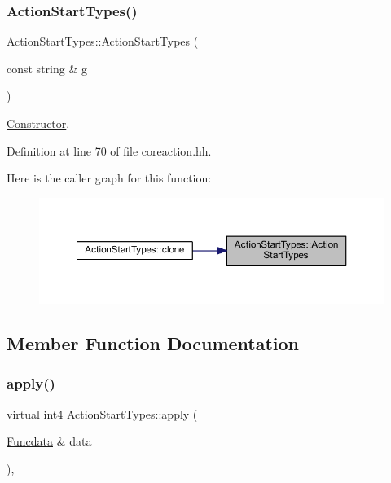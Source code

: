 \subsubsection{\texorpdfstring{ActionStartTypes()}{ActionStartTypes()}}
{\footnotesize\ttfamily Action\+Start\+Types\+::\+Action\+Start\+Types (\begin{DoxyParamCaption}\item[{const string \&}]{g }\end{DoxyParamCaption})\hspace{0.3cm}{\ttfamily [inline]}}



\mbox{\hyperlink{class_constructor}{Constructor}}. 



Definition at line 70 of file coreaction.\+hh.

Here is the caller graph for this function\+:
\nopagebreak
\begin{figure}[H]
\begin{center}
\leavevmode
\includegraphics[width=350pt]{class_action_start_types_a369a28fa31bbb8aafc9d8db2b1ac5d8a_icgraph}
\end{center}
\end{figure}


\subsection{Member Function Documentation}
\mbox{\label{class_action_start_types_a14215a512844751f3199f318f60add40}} 
\subsubsection{\texorpdfstring{apply()}{apply()}}
{\footnotesize\ttfamily virtual int4 Action\+Start\+Types\+::apply (\begin{DoxyParamCaption}\item[{\mbox{\hyperlink{class_funcdata}{Funcdata}} \&}]{data }\end{DoxyParamCaption})\hspace{0.3cm}{\ttfamily [inline]}, {\ttfamily [virtual]}}



